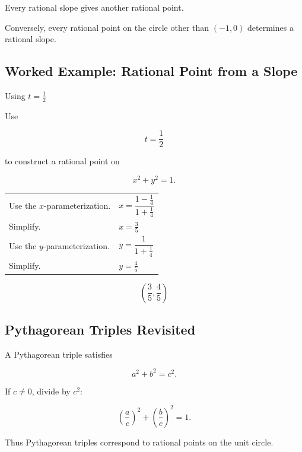Every rational slope gives another rational point.

Conversely, every rational point on the circle other than \((-1,0)\)
determines a rational slope.

\subsection{Worked Example: Rational Point from a Slope}
\label{subsec:worked-circle-rational-point}

\begin{workedexamplebox}{Using \(t=\frac12\)}

Use

\[ t=\frac12 \]

to construct a rational point on

\[ x^2+y^2=1. \]

\begin{tabularx}{\textwidth}{@{}>{\raggedright\arraybackslash}p{}X@{}}
Use the \(x\)-parameterization. &
\(x=\dfrac{1-\frac14}{1+\frac14}\)\\
Simplify. & \(x=\frac35\)\\
Use the \(y\)-parameterization. &
\(y=\dfrac{1}{1+\frac14}\)\\
Simplify. & \(y=\frac45\)
\end{tabularx}

\begin{answerbox}
\[ \boxed{\left(\frac35,\frac45\right)} \]
\end{answerbox}
\end{workedexamplebox}

\subsection{Pythagorean Triples Revisited}
\label{subsec:pythagorean-triples-geometry}

A Pythagorean triple satisfies

\[ a^2+b^2=c^2. \]

If \(c\neq0\), divide by \(c^2\):

\[ \left(\frac ac\right)^2+\left(\frac bc\right)^2=1. \]

Thus Pythagorean triples correspond to rational points on the unit circle.

